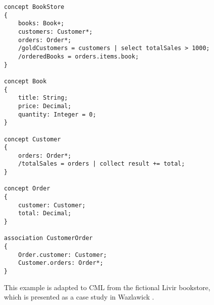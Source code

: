 \begin{figure}
\begin{verbatim}
concept BookStore
{
    books: Book+;
    customers: Customer*;
    orders: Order*;
    /goldCustomers = customers | select totalSales > 1000;
    /orderedBooks = orders.items.book;
}

concept Book
{
    title: String;
    price: Decimal;
    quantity: Integer = 0;
}

concept Customer
{
    orders: Order*;
    /totalSales = orders | collect result += total;
}

concept Order
{
    customer: Customer;
    total: Decimal;
}

association CustomerOrder
{
    Order.customer: Customer;
    Customer.orders: Order*;
}
\end{verbatim}
\caption{This example is adapted to CML from the fictional Livir bookstore, which is presented as a case study in Wazlawick \cite{wazlawick}.}
\label{fig:store}
\end{figure}
